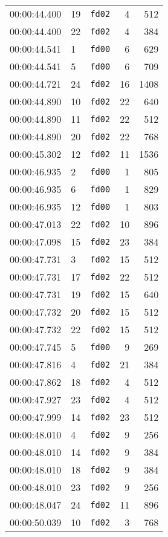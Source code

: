 \documentclass{article}
\begin{document}
\begin{longtable}{lllrr}
00:00:44.400 & 19 & \texttt{fd02} & 4 & 512 \\
00:00:44.400 & 22 & \texttt{fd02} & 4 & 384 \\
00:00:44.541 & 1 & \texttt{fd00} & 6 & 629 \\
00:00:44.541 & 5 & \texttt{fd00} & 6 & 709 \\
00:00:44.721 & 24 & \texttt{fd02} & 16 & 1408 \\
00:00:44.890 & 10 & \texttt{fd02} & 22 & 640 \\
00:00:44.890 & 11 & \texttt{fd02} & 22 & 512 \\
00:00:44.890 & 20 & \texttt{fd02} & 22 & 768 \\
00:00:45.302 & 12 & \texttt{fd02} & 11 & 1536 \\
00:00:46.935 & 2 & \texttt{fd00} & 1 & 805 \\
00:00:46.935 & 6 & \texttt{fd00} & 1 & 829 \\
00:00:46.935 & 12 & \texttt{fd00} & 1 & 803 \\
00:00:47.013 & 22 & \texttt{fd02} & 10 & 896 \\
00:00:47.098 & 15 & \texttt{fd02} & 23 & 384 \\
00:00:47.731 & 3 & \texttt{fd02} & 15 & 512 \\
00:00:47.731 & 17 & \texttt{fd02} & 22 & 512 \\
00:00:47.731 & 19 & \texttt{fd02} & 15 & 640 \\
00:00:47.732 & 20 & \texttt{fd02} & 15 & 512 \\
00:00:47.732 & 22 & \texttt{fd02} & 15 & 512 \\
00:00:47.745 & 5 & \texttt{fd00} & 9 & 269 \\
00:00:47.816 & 4 & \texttt{fd02} & 21 & 384 \\
00:00:47.862 & 18 & \texttt{fd02} & 4 & 512 \\
00:00:47.927 & 23 & \texttt{fd02} & 4 & 512 \\
00:00:47.999 & 14 & \texttt{fd02} & 23 & 512 \\
00:00:48.010 & 4 & \texttt{fd02} & 9 & 256 \\
00:00:48.010 & 14 & \texttt{fd02} & 9 & 384 \\
00:00:48.010 & 18 & \texttt{fd02} & 9 & 384 \\
00:00:48.010 & 23 & \texttt{fd02} & 9 & 256 \\
00:00:48.047 & 24 & \texttt{fd02} & 11 & 896 \\
00:00:50.039 & 10 & \texttt{fd02} & 3 & 768 \\

\end{longtable}
\end{document}
